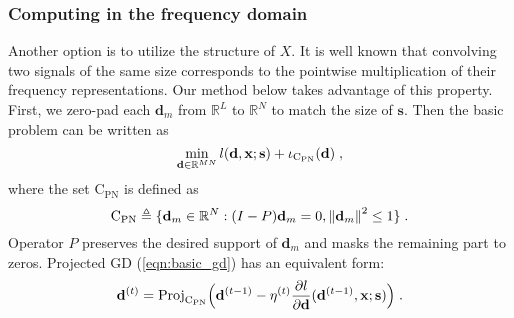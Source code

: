 \documentclass[final]{siamart1116}
\newcommand{\mb}[1]{\mathbf{#1}}
\providecommand{\norm}[1]{\left\lVert#1\right\rVert}
\def \R  {\mathbb{R}}
\begin{document}
\subsubsection{Computing in the frequency domain} Another option is to utilize the structure of $X$.
It is well known that convolving two signals of the same size corresponds to the pointwise multiplication of their frequency representations. Our method below takes advantage of this property.  First, we zero-pad each $\mb{d}_m$ from $\R^L$ to $\R^N$ to match the size of $\mb{s}$. Then the basic problem can be written as
\vspace{-1mm}
\begin{equation}
\label{eqn:basic_zeropad}\min_{\mb{d}\in\R^{MN}} l(\mb{d},\mb{x};\mb{s}) + \iota_{\text{C}_\text{PN}}(\mb{d}) \;,
\vspace{-1mm}
\end{equation}
where the set $\text{C}_\text{PN}$ is defined as
\vspace{-1mm}
\begin{equation}
\label{eqn:cpn}
\text{C}_\text{PN} \triangleq \{ \mb{d}_m \in \R^N: (I-P)\mb{d}_m=0, \norm{\mb{d}_m}^2\leq1 \} \;.
\vspace{-1mm}
\end{equation}
Operator $P$ preserves the desired support of $\mb{d}_m$ and masks the remaining part to zeros.  Projected GD (\ref{eqn:basic_gd}) has an equivalent form:
\vspace{-1mm}
\begin{equation}
\label{eqn:basic_gd_spatial}
\mb{d}^{(t)} = \text{Proj}_{\text{C}_\text{PN}}\Big(\mb{d}^{(t-1)} - \eta^{(t)}\frac{\partial l}{\partial \mb{d}}(\mb{d}^{(t-1)},\mb{x}; \mb{s}) \Big) \;.
\vspace{-1mm}
\end{equation}
\end{document}

